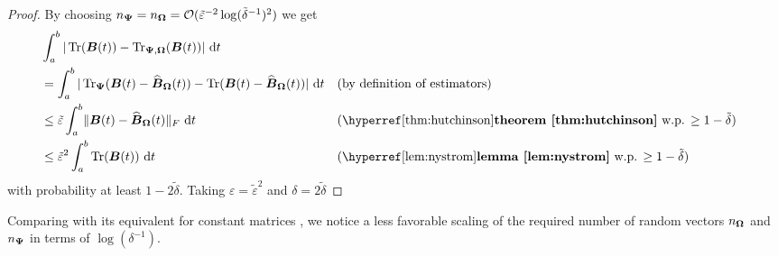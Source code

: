 \documentclass[12pt]{article}
\begin{document}
\begin{proof}
    By choosing $n_{\boldsymbol{\Psi}} = n_{\boldsymbol{\Omega}} = \mathcal{O}(\tilde{\varepsilon}^{-2} \log(\tilde{\delta}^{-1})^2)$ we get
    \begin{align}
        &\int_{a}^{b} | \Trace(\mtx{B}(t)) - \Nystrpp{\mtx{\Omega}}{\mtx{\Psi}}(\mtx{B}(t)) |~\mathrm{d}t \notag \\
        &= \int_{a}^{b} | \Hutch{\mtx{\Psi}}(\mtx{B}(t) - \Nystr{\mtx{\Omega}}{\mtx{B}}(t)) - \Trace(\mtx{B}(t) - \Nystr{\mtx{\Omega}}{\mtx{B}}(t)) |~\mathrm{d}t && \text{(by definition of estimators)} \notag \\
        &\leq \tilde{\varepsilon} \int_{a}^{b} \lVert \mtx{B}(t) - \Nystr{\mtx{\Omega}}{\mtx{B}}(t) \rVert _F ~\mathrm{d}t && \text{(\refthm{thm:hutchinson} w.p. $\geq 1 - \tilde{\delta}$)} \notag \\
        &\leq \tilde{\varepsilon}^2 \int_{a}^{b} \Trace(\mtx{B}(t)) ~\mathrm{d}t && \text{(\reflem{lem:nystrom} w.p. $\geq 1 - \tilde{\delta}$)} 
    \end{align}
    with probability at least $1 - 2\tilde{\delta}$. Taking $\varepsilon = \tilde{\varepsilon}^2$ and $\delta = 2 \tilde{\delta}$
\end{proof}

Comparing  with its equivalent for constant matrices \cite[theorem 3.4]{persson-2022-improved-variants}, we notice a less favorable scaling of the required number of random vectors $n_{\boldsymbol{\Omega}}$ and $n_{\boldsymbol{\Psi}}$ in terms of $\log(\delta^{-1})$.

\end{document}
